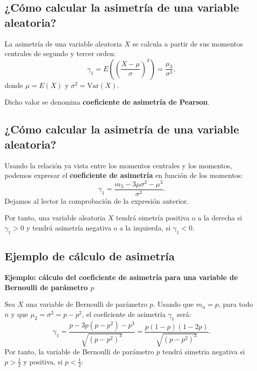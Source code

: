 \documentclass[]{book}
\begin{document}
\hypertarget{cuxf3mo-calcular-la-asimetruxeda-de-una-variable-aleatoria}{%
\subsection{¿Cómo calcular la asimetría de una variable aleatoria?}\label{cuxf3mo-calcular-la-asimetruxeda-de-una-variable-aleatoria}}

La asimetría de una variable aleatoria \(X\) se calcula a partir de sus momentos centrales de segundo y tercer orden:
\[
\gamma_1 = E\left({\left(\frac{X-\mu}{\sigma}\right)}^3\right)=\frac{\mu_3}{\sigma^3},
\]
donde \(\mu = E(X)\) y \(\sigma^2 =\mathrm{Var}(X)\).

Dicho valor se denomina \textbf{coeficiente de asimetría de Pearson}.

\hypertarget{cuxf3mo-calcular-la-asimetruxeda-de-una-variable-aleatoria-1}{%
\subsection{¿Cómo calcular la asimetría de una variable aleatoria?}\label{cuxf3mo-calcular-la-asimetruxeda-de-una-variable-aleatoria-1}}

Usando la relación ya vista entre los momentos centrales y los momentos, podemos expresar el \textbf{coeficiente de asimetría} en función de los momentos:
\[
\gamma_1 = \frac{m_3 -3\mu\sigma^2-\mu^3}{\sigma^3}.
\]
Dejamos al lector la comprobación de la expresión anterior.

Por tanto, una variable aleatoria \(X\) tendrá simetría positiva o a la derecha si \(\gamma_1 >0\) y tendrá asimetría negativa o a la izquierda, si \(\gamma_1 <0\).

\hypertarget{ejemplo-de-cuxe1lculo-de-asimetruxeda}{%
\subsection{Ejemplo de cálculo de asimetría}\label{ejemplo-de-cuxe1lculo-de-asimetruxeda}}

\textbf{Ejemplo: cálculo del coeficiente de asimetría para una variable de Bernoulli de parámetro \(p\)}

Sea \(X\) una variable de Bernoulli de parámetro \(p\). Usando que \(m_n =p\), para todo \(n\) y que \(\mu_2 = \sigma^2 = p-p^2\), el coeficiente de asimetría \(\gamma_1\) será:
\[
\gamma_1 = \frac{p-3p(p-p^2)-p^3}{\sqrt{(p-p^2)^3}} = \frac{p (1-p) (1-2p)}{{\sqrt{(p-p^2)^3}}}.
\]
Por tanto, la variable de Bernoulli de parámetro \(p\) tendrá simetria negativa si \(p>\frac{1}{2}\) y positiva, si \(p<\frac{1}{2}\):
\end{document}
